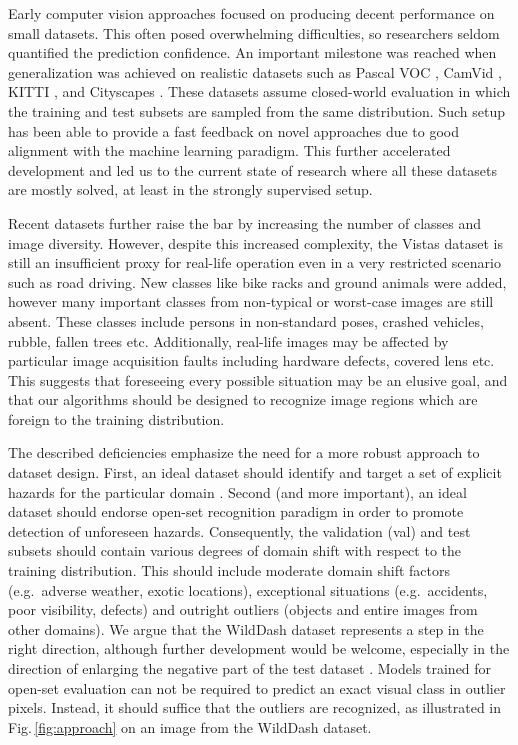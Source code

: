\documentclass[runningheads]{llncs}
\begin{document}
Early computer vision approaches focused
on producing decent performance 
on small datasets.
This often posed overwhelming difficulties, 
so researchers seldom quantified 
the prediction confidence. An important mi\-le\-stone
was reached when generalization 
was achieved
on realistic datasets
such as Pascal VOC \cite{everingham10ijcv},
CamVid \cite{brostow08eccv},
KITTI \cite{geiger13ijrr}, and
Cityscapes \cite{cordts15cvpr}.
These datasets assume 
closed-world evaluation 
\cite{scheirer13pami} 
in which the training and test subsets 
are sampled from the same distribution.
Such setup has been able to provide 
a fast feedback on novel approaches 
due to good alignment 
with the machine learning paradigm.
This further accelerated development 
and led us to the current state of research
where all these datasets are mostly solved, 
at least in the strongly supervised setup.

Recent datasets further raise the bar
by increasing the number of classes
and image diversity.
However, despite this increased complexity, 
the Vistas \cite{neuhold17iccv} dataset
is still an insufficient proxy 
for real-life operation
even in a very restricted scenario 
such as road driving.
New classes like bike racks 
and ground animals were added,
however many important classes from 
non-typical or worst-case images 
are still absent.
These classes include 
persons in non-standard poses,
crashed vehicles, rubble,
fallen trees etc.
Additionally, real-life images 
may be affected by 
particular image acquisition faults 
including hardware defects, 
covered lens etc.
This suggests that foreseeing every possible
situation may be an elusive goal, 
and that our algorithms
should be designed to recognize 
image regions which are foreign to
the training distribution.

The described deficiencies 
emphasize the need
for a more robust approach
to dataset design.
First, an ideal dataset should identify 
and target a set of explicit hazards
for the particular domain
\cite{zendel18eccv}.
Second (and more important),
an ideal dataset should endorse 
open-set recognition paradigm
\cite{scheirer13pami}
in order to promote 
detection of unforeseen hazards.
Consequently, the validation (val) 
and test subsets should contain
various degrees of domain shift
with respect to the training distribution.
This should include 
moderate domain shift factors
(e.g.\ adverse weather, exotic locations),
exceptional situations 
(e.g.\ accidents, poor visibility, defects)
and outright outliers 
(objects and entire images from other domains).
We argue that the WildDash dataset
\cite{zendel18eccv}
represents a step in the right direction,
although further development 
would be welcome, especially
in the direction of enlarging 
the negative part of the test dataset \cite{blum19arxiv}.
Models trained for open-set evaluation
can not be required 
to predict an exact visual class 
in outlier pixels.
Instead, it should suffice that 
the outliers are recognized,
as illustrated in Fig.\,\ref{fig:approach}
on an image from the WildDash dataset.
\end{document}

